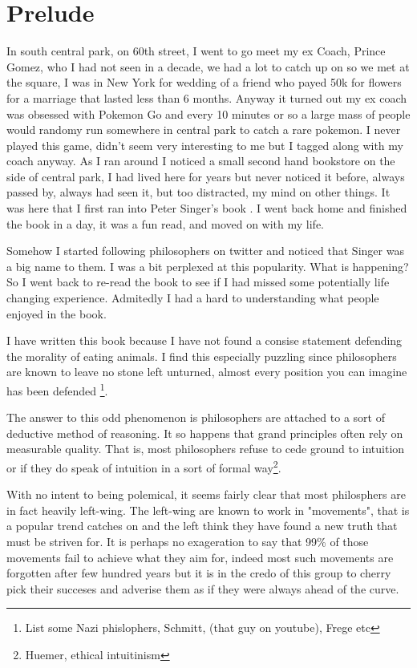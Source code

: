 
\chapter{Prelude}
In south central park, on 60th street, I went to go meet my ex Coach, Prince Gomez, who I had not seen in a decade, we had a lot to catch up on so we met at the square, I was in New York for wedding of a friend who payed 50k for flowers for a marriage that lasted less than 6 months. Anyway it turned out my ex coach was obsessed with Pokemon Go and every 10 minutes or so a large mass of people would randomy run somewhere in central park to catch a rare pokemon. I never played this game, didn't seem very interesting to me but I tagged along with my coach anyway. As I ran around I noticed a small second hand bookstore on the side of central park, I had lived here for years but never noticed it before, always passed by, always had seen it, but too distracted, my mind on other things. It was here that I first ran into Peter Singer's book \cite{singer1995animal}. I went back home and finished the book in a day, it was a fun read, and moved on with my life. 

Somehow I started following philosophers on twitter and noticed that Singer was a big name to them. I was a bit perplexed at this popularity. What is happening? So I went back to re-read the book to see if I had missed some potentially life changing experience. Admitedly I had a hard to understanding what people enjoyed in the book. 

I have written this book because I have not found a consise statement defending the morality of eating animals. I find this especially puzzling since philosophers are known to leave no stone left unturned, almost every position you can imagine has been defended \footnote{List some Nazi phislophers, Schmitt, (that guy on youtube), Frege etc}. 

The answer to this odd phenomenon is philosophers are attached to a sort of deductive method of reasoning. It so happens that grand principles often rely on measurable quality. That is, most philosophers refuse to cede ground to intuition or if they do speak of intuition in a sort of formal way\footnote{Huemer, ethical intuitinism}. 

With no intent to being polemical, it seems fairly clear that most philosphers are in fact heavily left-wing. The left-wing are known to work in "movements", that is a popular trend catches on and the left think they have found a new truth that must be striven for. It is perhaps no exageration to say that 99\% of those movements fail to achieve what they aim for, indeed most such movements are forgotten after few hundred years but it is in the credo of this group to cherry pick their succeses and adverise them as if they were always ahead of the curve. 

